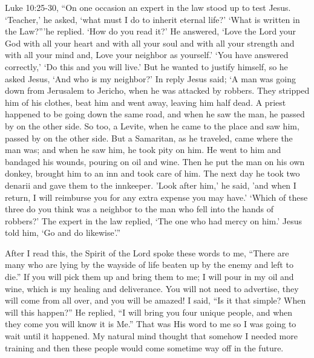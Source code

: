 \documentclass[oneside]{book}
\begin{document}
Luke 10:25-30, “On one occasion an expert in the law stood up to test Jesus. ‘Teacher,’ he asked, ‘what must I do to inherit eternal life?’ ‘What is written in the Law?”’he replied. ‘How do you read it?’ He answered, ‘Love the Lord your God with all your heart and with all your soul and with all your strength and with all your mind and, Love your neighbor as yourself.' ‘You have answered correctly,’ ‘Do this and you will live.’ But he wanted to justify himself, so he asked Jesus, ‘And who is my neighbor?’ In reply Jesus said; ‘A man was going down from Jerusalem to Jericho, when he was attacked by robbers. They stripped him of his clothes, beat him and went away, leaving him half dead. A priest happened to be going down the same road, and when he saw the man, he passed by on the other side. So too, a Levite, when he came to the place and saw him, passed by on the other side. But a Samaritan, as he traveled, came where the man was; and when he saw him, he took pity on him. He went to him and bandaged his wounds, pouring on oil and wine. Then he put the man on his own donkey, brought him to an inn and took care of him. The next day he took two denarii and gave them to the innkeeper. 'Look after him,' he said, 'and when I return, I will reimburse you for any extra expense you may have.' ‘Which of these three do you think was a neighbor to the man who fell into the hands of robbers?’ The expert in the law replied, ‘The one who had mercy on him.’ Jesus told him, ‘Go and do likewise’.”

After I read this, the Spirit of the Lord spoke these words to me, “There are many who are lying by the wayside of life beaten up by the enemy and left to die.” If you will pick them up and bring them to me; I will pour in my oil and wine, which is my healing and deliverance. You will not need to advertise, they will come from all over, and you will be amazed! I said, “Is it that simple? When will this happen?” He replied, “I will bring you four unique people, and when they come you will know it is Me.” That was His word to me so I was going to wait until it happened. My natural mind thought that somehow I needed more training and then these people would come sometime way off in the future.
\end{document}
